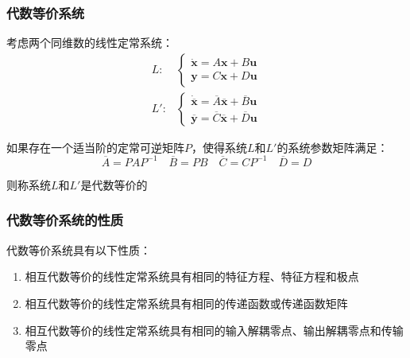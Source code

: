 \subsubsection{代数等价系统}
\begin{definition}[代数等价]
    考虑两个同维数的线性定常系统：
    \begin{equation*}
        \begin{split}
            L:&\begin{cases}
                \dot{\bm{x}} = A \bm{x} + B \bm{u} \\
                    \bm{y} = C \bm{x} + D \bm{u} 
        \end{cases}\\
        L':&    \begin{cases}
        \dot{\overline{\bm{x}}} = \overline{A} \overline{\bm{x}} + \overline{B} \bm{u} \\
        \bm{\overline{y}} = \overline{C} \overline{\bm{x}} + \overline{D} \bm{u} 
    \end{cases}
        \end{split}
    \end{equation*}

    如果存在一个适当阶的定常可逆矩阵$P$，使得系统$L$和$L'$的系统参数矩阵满足：
    \begin{equation*}
        \overline{A} = PAP^{-1} \quad \overline{B} = PB \quad \overline{C} = CP^{-1} \quad \overline{D} = D
    \end{equation*}

    则称系统$L$和$L'$是代数等价的
\end{definition}

\subsubsection{代数等价系统的性质}

\begin{property}
    代数等价系统具有以下性质：
    \begin{enumerate}
        \item 相互代数等价的线性定常系统具有相同的特征方程、特征方程和极点
        \item 相互代数等价的线性定常系统具有相同的传递函数或传递函数矩阵
        \item 相互代数等价的线性定常系统具有相同的输入解耦零点、输出解耦零点和传输零点
    \end{enumerate}
\end{property}

